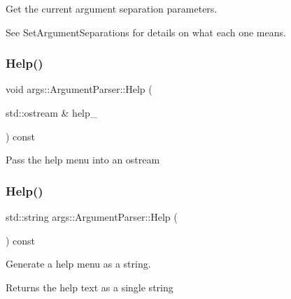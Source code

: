 Get the current argument separation parameters.

See Set\+Argument\+Separations for details on what each one means. \mbox{\label{classargs_1_1_argument_parser_a783b7d19d1f2687310adb159418ad234}} 
\subsubsection{\texorpdfstring{Help()}{Help()}\hspace{0.1cm}{\footnotesize\ttfamily [1/2]}}
{\footnotesize\ttfamily void args\+::\+Argument\+Parser\+::\+Help (\begin{DoxyParamCaption}\item[{std\+::ostream \&}]{help\+\_\+ }\end{DoxyParamCaption}) const\hspace{0.3cm}{\ttfamily [inline]}}

Pass the help menu into an ostream \mbox{\label{classargs_1_1_argument_parser_ac7ca97f929a12508187ed28734ae0714}} 
\subsubsection{\texorpdfstring{Help()}{Help()}\hspace{0.1cm}{\footnotesize\ttfamily [2/2]}}
{\footnotesize\ttfamily std\+::string args\+::\+Argument\+Parser\+::\+Help (\begin{DoxyParamCaption}{ }\end{DoxyParamCaption}) const\hspace{0.3cm}{\ttfamily [inline]}}

Generate a help menu as a string.

\begin{DoxyReturn}{Returns}
the help text as a single string 
\end{DoxyReturn}
\mbox{\label{classargs_1_1_argument_parser_a35f97d0a1219e2a01e10a697b7a24d21}} 
